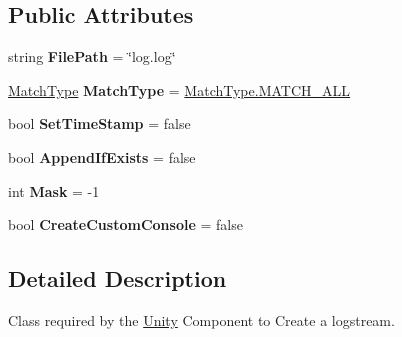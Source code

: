 \subsection*{Public Attributes}
\begin{DoxyCompactItemize}
\item 
\mbox{\label{class_a_d_l_1_1_unity_1_1_log_stream_params_a2ed1ac249e30afe029534a0e0cd83acd}} 
string {\bfseries File\+Path} = \char`\"{}log.\+log\char`\"{}
\item 
\mbox{\label{class_a_d_l_1_1_unity_1_1_log_stream_params_a0294891b93285cae2f2f44c667685c24}} 
\mbox{\hyperlink{namespace_a_d_l_af6334296dbae0383a652317263f0bc05}{Match\+Type}} {\bfseries Match\+Type} = \mbox{\hyperlink{namespace_a_d_l_af6334296dbae0383a652317263f0bc05a627c7991c5d0265194247e92fcf120b0}{Match\+Type.\+M\+A\+T\+C\+H\+\_\+\+A\+LL}}
\item 
\mbox{\label{class_a_d_l_1_1_unity_1_1_log_stream_params_ad27da98d363d1b2de2c2acef2aa2ba99}} 
bool {\bfseries Set\+Time\+Stamp} = false
\item 
\mbox{\label{class_a_d_l_1_1_unity_1_1_log_stream_params_ab10680435c136de2248cf8a7fbad1a21}} 
bool {\bfseries Append\+If\+Exists} = false
\item 
\mbox{\label{class_a_d_l_1_1_unity_1_1_log_stream_params_a4ca708b4f6265d958253b4aa6c88ae9f}} 
int {\bfseries Mask} = -\/1
\item 
\mbox{\label{class_a_d_l_1_1_unity_1_1_log_stream_params_a0a044c493acf72de9c5ee1e35575bc13}} 
bool {\bfseries Create\+Custom\+Console} = false
\end{DoxyCompactItemize}


\subsection{Detailed Description}
Class required by the \mbox{\hyperlink{namespace_a_d_l_1_1_unity}{Unity}} Component to Create a logstream. 



